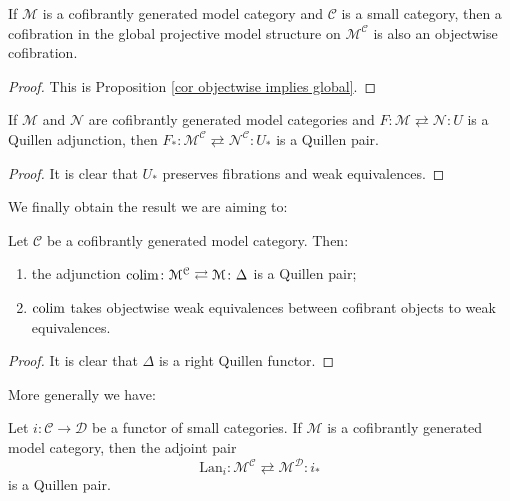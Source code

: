 \begin{refsection}
\begin{cor} \label{cor global projective cofibration}
If $\mathcal M$ is a cofibrantly generated model category and $\mathcal C$ is a small category, then a cofibration in the global projective model structure on $\mathcal M^{\mathcal C}$ is also an objectwise cofibration.
\end{cor}

\begin{proof}
This is Proposition \ref{cor objectwise implies global}.
\end{proof}

\begin{cor}
If $\mathcal M$ and $\mathcal N$ are cofibrantly generated model categories and $F \colon \mathcal M \rightleftarrows \mathcal N \colon U$ is a Quillen adjunction, then $F_* \colon \mathcal M^{\mathcal C} \rightleftarrows \mathcal N^{\mathcal C} \colon U_*$ is a Quillen pair.
\end{cor}

\begin{proof}
It is clear that $U_*$ preserves fibrations and weak equivalences.
\end{proof}

We finally obtain the result we are aiming to:

\begin{thm}
Let $\mathcal C$ be a cofibrantly generated model category. Then:
\begin{enumerate}
\item the adjunction $\operatorname*{colim} \colon \mathcal M^{\mathcal C} \rightleftarrows \mathcal M \colon \Delta$ is a Quillen pair;
\item $\operatorname*{colim}$ takes objectwise weak equivalences between cofibrant objects to weak equivalences.
\end{enumerate}
\end{thm}

\begin{proof}
It is clear that $\Delta$ is a right Quillen functor.
\end{proof}

More generally we have:

\begin{thm}
Let $i \colon \mathcal C \to \mathcal D$ be a functor of small categories. If $\mathcal M$ is a cofibrantly generated model category, then the adjoint pair
\[
\mathrm{Lan}_i \colon \mathcal M^{\mathcal C} \rightleftarrows \mathcal M^{\mathcal D} \colon i_*
\]
is a Quillen pair.
\end{thm}


\end{refsection}
